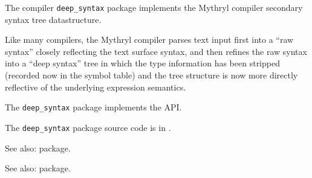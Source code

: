 
The compiler {\tt deep\_syntax} package implements 
the Mythryl compiler 
secondary syntax tree datastructure.

Like many compilers, the Mythryl 
compiler parses text input first into a ``raw syntax'' closely reflecting 
the text surface syntax, and then refines the raw syntax into a 
``deep syntax'' tree in which the type information has been stripped 
(recorded now in the symbol table) and the tree structure is now more 
directly reflective of the underlying expression semantics.

The {\tt deep\_syntax} package implements the  API.

The {\tt deep\_syntax} package source code is in .

See also:   package.

See also:   package.




